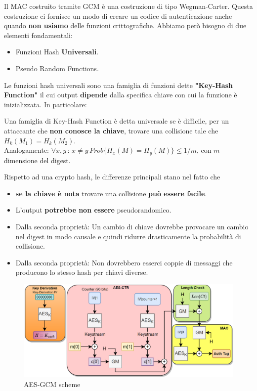 \begin{corollary}\label{cor:wegmancarter}

Il MAC costruito tramite GCM è una costruzione di tipo Wegman-Carter. Questa costruzione ci fornisce un modo di creare un codice di autenticazione anche quando \textbf{non usiamo} delle funzioni crittografiche. Abbiamo però bisogno di due elementi fondamentali:
\begin{itemize}
    \item Funzioni Hash \textbf{Universali}.
    \item Pseudo Random Functions.
\end{itemize}
\end{corollary}
Le funzioni hash universali sono una famiglia di funzioni dette \textbf{"Key-Hash Function"} il cui output \textbf{dipende} dalla specifica chiave con cui la funzione è inizializzata. In particolare:
\begin{definition}
Una famiglia di Key-Hash Function è detta universale se è difficile, per un attaccante che \textbf{non conosce la chiave}, trovare una collisione tale che $H_k(M_1)=H_k(M_2)$.\\
Analogamente: $\forall{x,y}\,:\,x\ne{y}\, Prob\{H_x(M)=H_y(M)\}\leq{1/m}$, con $m$ dimensione del digest. 
\end{definition}
Rispetto ad una crypto hash, le differenze principali stano nel fatto che 
\begin{itemize}
    \item \textbf{se la chiave è nota} trovare una collisione  \textbf{può essere facile}.
    \item L'output \textbf{potrebbe non essere} pseudorandomico.
    \item Dalla seconda proprietà: Un cambio di chiave dovrebbe provocare un cambio nel digest in modo causale e quindi ridurre drasticamente la probabilità di collisione.
    \item Dalla seconda proprietà: Non dovrebbero esserci coppie di messaggi che producono lo stesso hash per chiavi diverse. 
\end{itemize}
\begin{figure}[H]
    \centering
    \includegraphics[width=0.8\linewidth]{image/aesgcm.png}
    \caption{AES-GCM scheme}
    \label{fig:aesgcm}
\end{figure}
